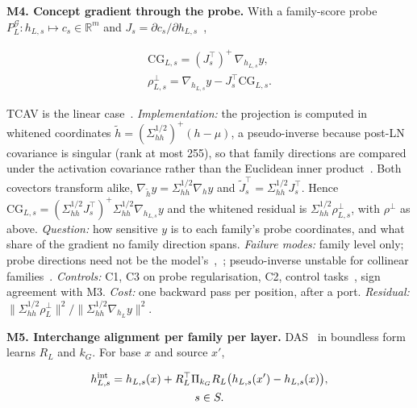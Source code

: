 \documentclass[conference]{IEEEtran}
\begin{document}
\textbf{M4. Concept gradient through the probe.} With a family-score probe $P^{\mathcal G}_L:h_{L,s}\mapsto c_s\in\mathbb R^m$ and $J_s=\partial c_s/\partial h_{L,s}$~\cite{bai2023},

\[
\begin{gathered}\mathrm{CG}_{L,s}=(J_s^\top)^{+}\,\nabla_{h_{L,s}}y,\\
\rho^\perp_{L,s}=\nabla_{h_{L,s}}y-J_s^\top\mathrm{CG}_{L,s}.\end{gathered}
\]

TCAV is the linear case~\cite{kim2018}. \emph{Implementation:} the projection is computed in whitened coordinates $\tilde h=(\Sigma_{hh}^{1/2})^{+}(h-\mu)$, a pseudo-inverse because post-LN covariance is singular (rank at most 255), so that family directions are compared under the activation covariance rather than the Euclidean inner product~\cite{park2024}. Both covectors transform alike, $\nabla_{\tilde h}y=\Sigma_{hh}^{1/2}\nabla_hy$ and $\tilde J_s^\top=\Sigma_{hh}^{1/2}J_s^\top$. Hence $\mathrm{CG}_{L,s}=(\Sigma_{hh}^{1/2}J_s^\top)^{+}\Sigma_{hh}^{1/2}\nabla_{h_{L,s}}y$ and the whitened residual is $\Sigma_{hh}^{1/2}\rho^\perp_{L,s}$, with $\rho^\perp$ as above. \emph{Question:} how sensitive $y$ is to each family's probe coordinates, and what share of the gradient no family direction spans. \emph{Failure modes:} family level only; probe directions need not be the model's~\cite{park2024},~\cite{tucker2021}; pseudo-inverse unstable for collinear families~\cite{nicolson2025}. \emph{Controls:} C1, C3 on probe regularisation, C2, control tasks~\cite{hewitt2019}, sign agreement with M3. \emph{Cost:} one backward pass per position, after a port. \emph{Residual:} $\|\Sigma_{hh}^{1/2}\rho^\perp_L\|^2/\|\Sigma_{hh}^{1/2}\nabla_{h_L}y\|^2$.

\textbf{M5. Interchange alignment per family per layer.} DAS~\cite{geiger2024} in boundless form~\cite{wu2023} learns $R_L$ and $k_G$. For base $x$ and source $x'$,

\[
\begin{gathered}h^{\rm int}_{L,s}=h_{L,s}(x)+R_L^\top\Pi_{k_G}R_L\big(h_{L,s}(x')-h_{L,s}(x)\big),\\
s\in S.\end{gathered}
\]
\end{document}
